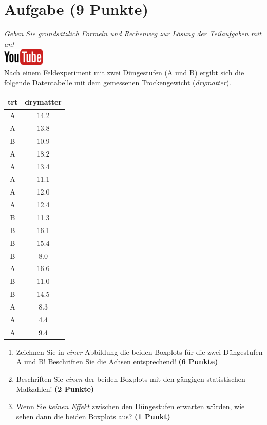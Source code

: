 \documentclass[a4paper, 10pt]{scrartcl}\usepackage[]{graphicx}\usepackage[]{xcolor}
\begin{document}
 
\clearpage

\section{Aufgabe \hfill (9 Punkte)}

\textit{Geben Sie grunds{\"a}tzlich Formeln und Rechenweg zur L{\"o}sung der
  Teilaufgaben mit an!} \\[1Ex]

\hfill\href{https://youtu.be/0xc0jIPeiyw}{\includegraphics[width =
  2cm]{img/youtube}}\\[1Ex]


Nach einem Feldexperiment mit zwei D{\"u}ngestufen (A und B) ergibt sich die
folgende Datentabelle mit dem gemessenen Trockengewicht (\textit{drymatter}). 

\begin{table}[!h]
\centering
\begin{tabular}{cc}
\toprule
trt & drymatter\\
\midrule
A & 14.2\\
A & 13.8\\
B & 10.9\\
A & 18.2\\
A & 13.4\\
\addlinespace
A & 11.1\\
A & 12.0\\
A & 12.4\\
B & 11.3\\
B & 16.1\\
\addlinespace
B & 15.4\\
B & 8.0\\
A & 16.6\\
B & 11.0\\
B & 14.5\\
\addlinespace
A & 8.3\\
A & 4.4\\
A & 9.4\\
\bottomrule
\end{tabular}
\end{table}



\begin{enumerate}
\item Zeichnen Sie in \textit{einer} Abbildung die beiden Boxplots f{\"u}r die
  zwei D{\"u}ngestufen A und B! Beschriften Sie die Achsen entsprechend!
  \textbf{(6 Punkte)}
\item Beschriften Sie \textit{einen} der beiden Boxplots mit den g{\"a}ngigen
  statistischen Ma{\ss}zahlen! \textbf{(2 Punkte)}
\item Wenn Sie \textit{keinen Effekt} zwischen den D{\"u}ngestufen erwarten
  w{\"u}rden, wie sehen dann die beiden Boxplots aus? \textbf{(1 Punkt)}
\end{enumerate} 
\clearpage
\end{document}
